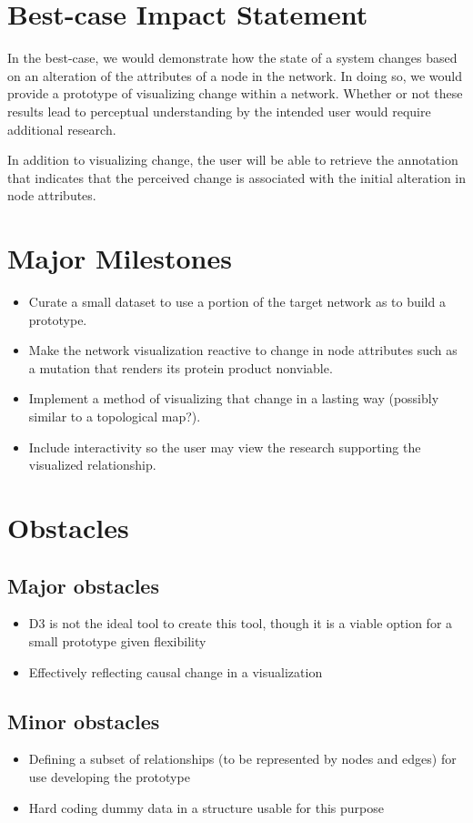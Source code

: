 \documentclass{proc}	%
\begin{document}
\section{Best-case Impact Statement}
In the best-case, we would demonstrate how the state of a system changes based on an alteration of the attributes of a node in the network. In doing so, we would provide a prototype of visualizing change within a network. Whether or not these results lead to perceptual understanding by the intended user would require additional research.

In addition to visualizing change, the user will be able to retrieve the annotation that indicates that the perceived change is associated with the initial alteration in node attributes.

\section{Major Milestones}
\begin{itemize}
  \item Curate a small dataset to use a portion of the target network as to build a prototype.
  \item Make the network visualization reactive to change in node attributes such as a mutation that renders its protein product nonviable.
  \item Implement a method of visualizing that change in a lasting way (possibly similar to a topological map?).
  \item Include interactivity so the user may view the research supporting the visualized relationship.
\end{itemize}

\section{Obstacles}
\subsection{Major obstacles} %
\begin{itemize}
  \item D3 is not the ideal tool to create this tool, though it is a viable option for a small prototype given flexibility
  \item Effectively reflecting causal change in a visualization
\end{itemize}

\subsection{Minor obstacles}
\begin{itemize}
  \item Defining a subset of relationships (to be represented by nodes and edges) for use developing the prototype
  \item Hard coding dummy data in a structure usable for this purpose
\end{itemize}
\end{document}
